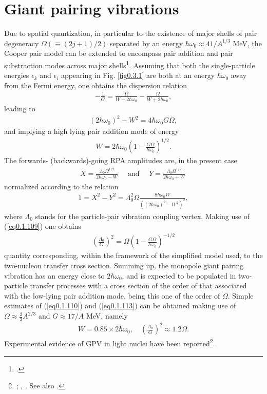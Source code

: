 \section{Giant pairing vibrations}\label{Sect2.6}
Due to spatial quantization, in particular to the existence of major shells of pair degeneracy $\Omega(\equiv(2j+1)/2)$ separated by an energy $\hbar\omega_0\approx41/A^{1/3}$ MeV, the Cooper pair model can be extended to encompass pair addition and pair substraction modes across major shells\footnote{\cite{Broglia:77}.}. Assuming that both the single-particle energies $\epsilon_k$ and $\epsilon_i$ appearing in Fig. \ref{fig0.3.1} are both at an energy    $\hbar\omega_0$ away from the Fermi energy, one obtains the dispersion relation 
\begin{align}\label{eq0.1.108}
-\frac{1}{G}=\frac{\Omega}{W-2\hbar\omega_0}-\frac{\Omega}{W+2\hbar\omega_0},
\end{align}
leading to
\begin{align}\label{eq0.1.109}
(2\hbar\omega_0)^2-W^2=4\hbar\omega_0G\Omega,
\end{align}
and implying a high lying pair addition mode of energy
\begin{align}\label{eq0.1.110}
W=2\hbar\omega_0\left(1-\frac{G\Omega}{\hbar\omega_0}\right)^{1/2}.
\end{align}
The forwards- (backwards)-going RPA amplitudes are, in the present case
\begin{align}\label{eq0.1.111}
X=\frac{\Lambda_0\Omega^{1/2}}{2\hbar\omega_0-W}\quad\text{ and      }\quad Y=\frac{\Lambda_0\Omega^{1/2}}{2\hbar\omega_0+W}\
\end{align}
normalized according to the relation 
\begin{align}\label{eq0.1.112}
1=X^2-Y^2=\Lambda^2_0\Omega\frac{8\hbar\omega_0W}{\left((2\hbar\omega_0)^2-W^2\right)^2},
\end{align}
where $\Lambda_0$ stands for the particle-pair vibration coupling vertex. Making use of (\ref{eq0.1.109}) one obtains
\begin{align}\label{eq0.1.113}
\left(\frac{\Lambda_0}{G}\right)^2=\Omega\left(1-\frac{G\Omega}{\hbar\omega_0}\right)^{-1/2}
\end{align}
quantity corresponding, within the framework of the simplified model used, to the two-nucleon transfer cross section. Summing up, the monopole giant pairing vibration has an energy close to $2\hbar\omega_0$, and is expected to be populated in two-particle transfer processes with a cross section of the order of that associated with the low-lying pair addition mode, being this one of the order of $\Omega$. Simple estimates of (\ref{eq0.1.110}) and (\ref{eq0.1.113}) can be obtained making use of $\Omega\approx\frac{2}{3}A^{2/3}$
and $G\approx17/A$ MeV, namely 
\begin{align}\label{eq0.1.114}
W=0.85\times2\hbar\omega_0,\quad\left(\frac{\Lambda_0}{G}\right)^2\approx1.2 \Omega.
\end{align}
Experimental evidence of GPV in light nuclei have been reported\footnote{\cite{Cappuzzello:15}; \cite{Cavallaro:19},  \cite{Bortignon:16}. See also \cite{Laskin:16,Betan:02,Dussel:09,Mouginot:11,Khan:04,Avez:08,Khan:09,Dasso:15,Fortunato:02,Herzog:86,Betan:02}.}.
